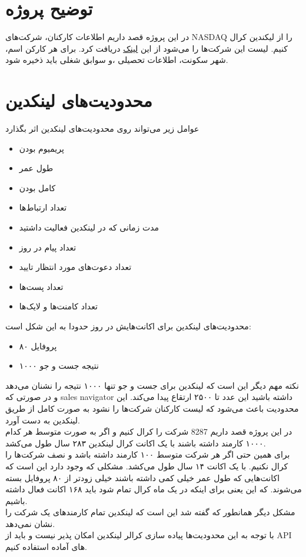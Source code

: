 \section{توضیح پروژه}
در این پروژه قصد داریم اطلاعات کارکنان، شرکت‌های NASDAQ را از لیکندین کرال کنیم. 
لیست این شرکت‌ها را می‌شود از این 
\href{https://www.nasdaq.com/market-activity/stocks/screener}{لینک}
دریافت کرد. برای هر کارکن اسم، شهر سکونت، اطلاعات تحصیلی ،و سوابق شغلی باید ذخیره شود.

\section{محدودیت‌های لینکدین}
عوامل زیر می‌تواند روی محدودیت‌های لینکدین اثر بگذارد
\begin{itemize}
    \item پریمیوم بودن 
    \item طول عمر 
    \item کامل بودن
    \item تعداد ارتباط‌ها
    \item مدت زمانی که در لینکدین فعالیت داشتید
    \item تعداد پیام در روز
    \item تعداد دعوت‌های مورد انتظار تایید
    \item تعداد پست‌ها
    \item تعداد کامنت‌ها و لایک‌ها
\end{itemize}

محدودیت‌های لینکدین برای اکانت‌هایش در روز حدودا به این شکل است:
\begin{itemize}
    \item ۸۰ پروفایل
    \item ۱۰۰۰ نتیجه جست و جو
\end{itemize}
نکته مهم دیگر این است که لینکدین برای جست و جو تنها ۱۰۰۰ نتیجه را نشنان می‌دهد و در صورتی که sales navigator داشته باشید این عدد تا ۲۵۰۰ ارتقاع پیدا می‌کند. این محدودیت باعث می‌شود که لیست کارکنان شرکت‌ها را نشود به صورت کامل از طریق لینکدین به دست آورد.\\
در این پروژه قصد داریم 8287 شرکت را کرال کنیم و اگر به صورت متوسط هر کدام ۱۰۰۰ کارمند داشته باشند با یک اکانت کرال لینکدین ۲۸۳ سال طول می‌کشد.\\
برای همین حتی اگر هر شرکت متوسط ۱۰۰ کارمند داشته باشد و نصف شرکت‌ها را کرال نکنیم. با یک اکانت ۱۴ سال طول می‌کشد. مشکلی که وجود دارد این است که اکانت‌هایی که طول عمر خیلی کمی داشته باشند خیلی زودتر از ۸۰ پروفایل بسته می‌شوند. که این یعنی برای اینکه در یک ماه کرال تمام شود باید ۱۶۸ اکانت فعال داشته باشیم.\\
مشکل دیگر همانطور که گفته شد این است که لینکدین تمام کارمند‌های یک شرکت را نشان نمی‌دهد.\\
با توجه به این محدودیت‌ها پیاده سازی کرالر لینکدین امکان پذیر نیست و باید از API های آماده استفاده کنیم.

